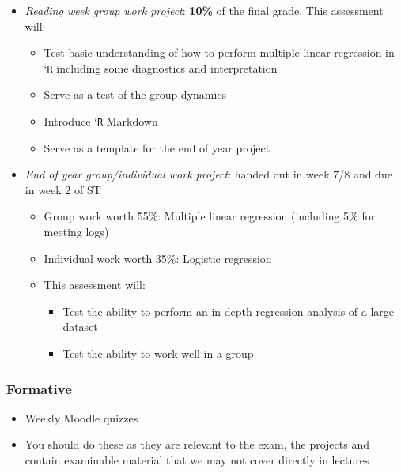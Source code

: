 \documentclass[
]{gitbook}
\providecommand{\tightlist}{%
  \setlength{\itemsep}{0pt}\setlength{\parskip}{0pt}}
\begin{document}
\begin{itemize}
\tightlist
\item
  \emph{Reading week group work project}: \textbf{10\%} of the final grade. This assessment will:

  \begin{itemize}
  \tightlist
  \item
    Test basic understanding of how to perform multiple linear regression in `\texttt{R} including some diagnostics and interpretation
  \item
    Serve as a test of the group dynamics
  \item
    Introduce `\texttt{R} Markdown
  \item
    Serve as a template for the end of year project
  \end{itemize}
\item
  \emph{End of year group/individual work project}: handed out in week 7/8 and due in week 2 of ST

  \begin{itemize}
  \tightlist
  \item
    Group work worth 55\%: Multiple linear regression (including 5\% for meeting logs)
  \item
    Individual work worth 35\%: Logistic regression
  \item
    This assessment will:

    \begin{itemize}
    \tightlist
    \item
      Test the ability to perform an in-depth regression analysis of a large dataset\\
    \item
      Test the ability to work well in a group
    \end{itemize}
  \end{itemize}
\end{itemize}

\hypertarget{formative}{%
\subsubsection{Formative}\label{formative}}

\begin{itemize}
\tightlist
\item
  Weekly Moodle quizzes
\item
  You should do these as they are relevant to the exam, the projects and contain examinable material that we may not cover directly in lectures
\end{itemize}
\end{document}
